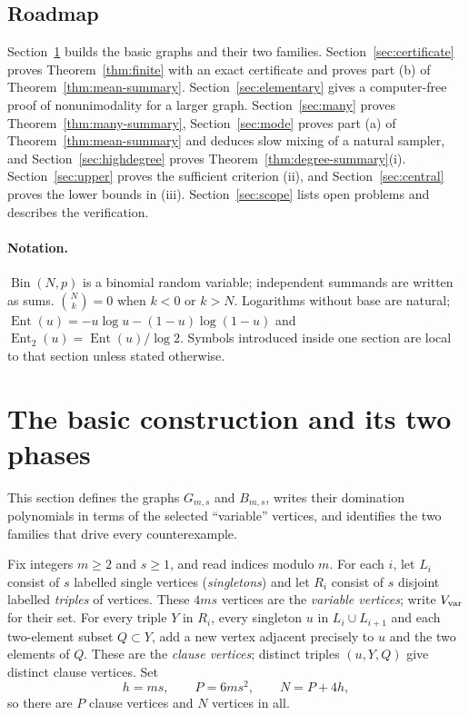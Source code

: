 \documentclass[11pt,a4paper]{article}
\theoremstyle{definition}
\theoremstyle{remark}
\newcommand{\Bin}{\operatorname{Bin}}
\newcommand{\Ent}{\operatorname{Ent}}
\begin{document}
\subsection{Roadmap}
Section~\ref{sec:construction} builds the basic graphs and their two families. Section~\ref{sec:certificate} proves Theorem~\ref{thm:finite} with an exact certificate and proves part (b) of Theorem~\ref{thm:mean-summary}. Section~\ref{sec:elementary} gives a computer-free proof of nonunimodality for a larger graph. Section~\ref{sec:many} proves Theorem~\ref{thm:many-summary}, Section~\ref{sec:mode} proves part (a) of Theorem~\ref{thm:mean-summary} and deduces slow mixing of a natural sampler, and Section~\ref{sec:highdegree} proves Theorem~\ref{thm:degree-summary}(i). Section~\ref{sec:upper} proves the sufficient criterion (ii), and Section~\ref{sec:central} proves the lower bounds in (iii). Section~\ref{sec:scope} lists open problems and describes the verification.

\paragraph{Notation.} $\Bin(N,p)$ is a binomial random variable; independent summands are written as sums. $\binom{N}{k}=0$ when $k<0$ or $k>N$. Logarithms without base are natural; $\Ent(u)=-u\log u-(1-u)\log(1-u)$ and $\Ent_2(u)=\Ent(u)/\log 2$. Symbols introduced inside one section are local to that section unless stated otherwise.

\section{The basic construction and its two phases}\label{sec:construction}
This section defines the graphs $G_{m,s}$ and $B_{m,s}$, writes their domination polynomials in terms of the selected ``variable'' vertices, and identifies the two families that drive every counterexample.

Fix integers $m\ge2$ and $s\ge1$, and read indices modulo $m$. For each $i$, let $L_i$ consist of $s$ labelled single vertices (\emph{singletons}) and let $R_i$ consist of $s$ disjoint labelled \emph{triples} of vertices. These $4ms$ vertices are the \emph{variable vertices}; write $V_{\rm var}$ for their set. For every triple $Y$ in $R_i$, every singleton $u$ in $L_i\cup L_{i+1}$ and each two-element subset $Q\subset Y$, add a new vertex adjacent precisely to $u$ and the two elements of $Q$. These are the \emph{clause vertices}; distinct triples $(u,Y,Q)$ give distinct clause vertices. Set
\[
h=ms,\qquad P=6ms^2,\qquad N=P+4h,
\]
so there are $P$ clause vertices and $N$ vertices in all.
\end{document}
